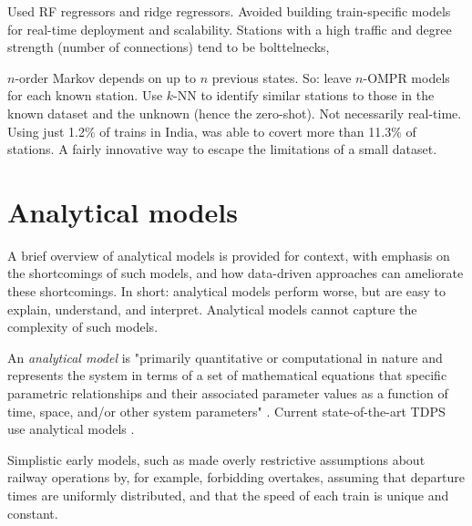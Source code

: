 \documentclass{article}
\begin{document}
Used RF regressors and ridge regressors. Avoided building train-specific models for real-time deployment and scalability. Stations with a high traffic and degree strength (number of connections) tend to be bolttelnecks, 

$n$-order Markov depends on up to $n$ previous states. So: leave $n$-OMPR models for each known station. Use $k$-NN to identify similar stations to those in the known dataset and the unknown (hence the zero-shot). Not necessarily real-time. Using just 1.2\% of trains in India, was able to covert more than 11.3\% of stations. A fairly innovative way to escape the limitations of a small dataset. 






































\clearpage
\section{Analytical models}

A brief overview of analytical models is provided for context, with emphasis on the shortcomings of such models, and how data-driven approaches can ameliorate these shortcomings. In short: analytical models
perform worse, but are easy to explain, understand, and interpret. Analytical models cannot capture the complexity of such models. 

An \textit{analytical model} is "primarily quantitative or computational in nature and represents the system in terms of a set of mathematical equations that specific parametric relationships and their associated
parameter values as a function of time, space, and/or other system parameters" \cite{friedenthal_moore_steiner_2012}. Current state-of-the-art TDPS use analytical models \cite{oneto_fumeo_clerico_canepa_papa_dambra_mazzino_anguita_2016}.

Simplistic early models, such as \cite{frank_1966} made overly restrictive assumptions about railway operations by, for example, forbidding overtakes, assuming that departure times are uniformly distributed,
and that the speed of each train is unique and constant. 
\end{document}
